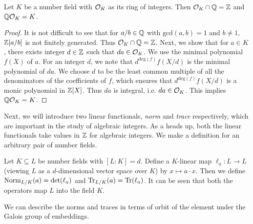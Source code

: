\documentclass[11pt]{article}
\begin{document}
\begin{lemma}\label{lem:roi-q-intersection}
Let $K$ be a number field with $\mathcal{O}_{K}$ as its ring of integers. Then $\mathcal{O}_{K}\cap \mathbb{Q}=\mathbb{Z}$ and
$\mathbb{Q} \mathcal{O}_{K}=K$.
\end{lemma}
\begin{proof}
It is not difficult to see that for $a/b\in \mathbb{Q}$ with $\mathrm{gcd}(a,b)=1$ and $b\neq 1$, $\mathbb{Z}[a/b]$ is not
finitely generated. Thus $\mathcal{O}_{K}\cap \mathbb{Q}=\mathbb{Z}$. Next, we show that for $a\in K$, there exists integer $d\in \mathbb{Z}$
such that $da\in \mathcal{O}_{K}$. We use the minimal polynomial $f(X)$ of $a$. For an integer $d$, we note that
$d^{\mathrm{deg}(f)}f(X/d)$ is the minimal polynomial of $da$. We choose $d$ to be the least common multiple of
all the denominators of the coefficients of $f$, which ensures that $d^{\mathrm{deg}(f)}f(X/d)$ is a monic polynomial
in $\mathbb{Z}[X]$. Thus $da$ is integral, i.e. $da\in \mathcal{O}_{K}$. This implies $\mathbb{Q} \mathcal{O}_{K}=K$.
\end{proof}

Next, we will introduce two linear functionals, {\em norm} and {\em trace} respectively, which are important in
the study of algebraic integers. As a heads up, both the linear functionals take values in $\mathbb{Z}$ for algebraic
integers. We make a definition for an arbitrary pair of number fields.

\begin{definition}\label{defn:norm-and-trace}
Let $K\subseteq L$ be number fields with $[L:K]=d$. Define a $K$-linear map $\ell_a: L\rightarrow L$ (viewing
$L$ as a $d$-dimensional vector space over $K$) by $x\mapsto a\cdot x$. Then we define $\mathrm{Norm}_{L/{K}}(a)=\mathrm{det}({\ell_a})$ and
$\mathrm{Tr}_{L/{K}}(a)=\mathrm{Tr}(\ell_a)$. It can be seen that both the operators map $L$ into the field $K$.
\end{definition}

We can describe the norms and traces in terms of orbit of the element under the Galois group of embeddings.
\end{document}
